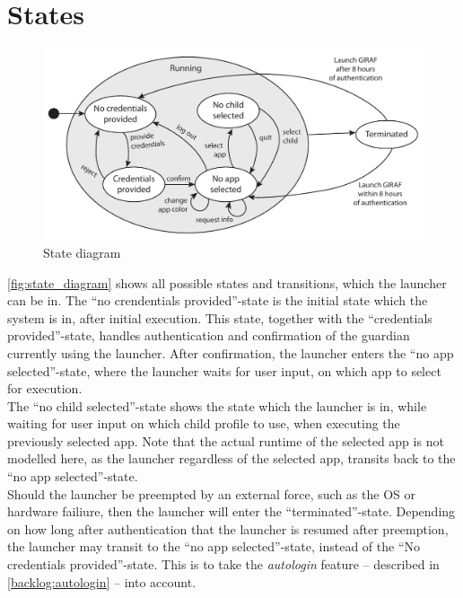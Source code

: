 \section{States}



\begin{figure}[h]
	\centering
	\includegraphics[width=1\textwidth]{gfx/statediagram.pdf}
	\caption{State diagram}
	\label{fig:state_diagram}
\end{figure}

\autoref{fig:state_diagram} shows all possible states and transitions, which the launcher can be in.
The ``no crendentials provided''-state is the initial state which the system is in, after initial execution.
This state, together with the ``credentials provided''-state, handles authentication and confirmation of the guardian currently using the launcher.
After confirmation, the launcher enters the ``no app selected''-state, where the launcher waits for user input, on which app to select for execution. \\

The ``no child selected''-state shows the state which the launcher is in, while waiting for user input on which child profile to use, when executing the previously selected app.
Note that the actual runtime of the selected app is not modelled here, as the launcher regardless of the selected app, transits back to the ``no app selected''-state. \\

Should the launcher be preempted by an external force, such as the OS or hardware failiure, then the launcher will enter the ``terminated''-state.
Depending on how long after authentication that the launcher is resumed after preemption, the launcher may transit to the ``no app selected''-state, instead of the ``No credentials provided''-state.
This is to take the \emph{autologin} feature -- described in \autoref{backlog:autologin} -- into account.
